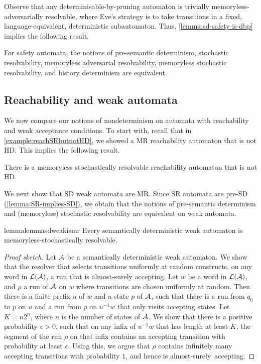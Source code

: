 Observe that any determinisable-by-pruning automaton is trivially memoryless-adversarially resolvable, where Eve's strategy is to take transitions in a fixed, language-equivalent, deterministic subautomaton. Thus, \cref{lemma:sd-safety-is-dbp} implies the following result.

\begin{lemma}\label{lemma:comp-safety}
    For safety automata, the notions of pre-semantic determinism, stochastic resolvability, memoryless adversarial resolvability, memoryless stochastic resolvability, and history determinism are equivalent.
\end{lemma}

\subsection{Reachability and weak automata}\label{subsec:sac-rw}
We now compare our notions of nondeterminism on automata with reachability and weak acceptance conditions. To start with, recall that in \cref{example:reachSRbutnotHD}, we showed a MR reachability automaton that is not HD. This implies the following result.
\begin{lemma}\label{lemma:reachability-MR-not-HD}
    There is a memoryless stochastically resolvable reachability automaton that is not HD.
\end{lemma}

We next show that SD weak automata are MR. Since SR automata are pre-SD (\cref{lemma:SR-implies-SD}), we obtain that the notions of pre-semantic determinism and (memoryless) stochastic resolvability are equivalent on weak automata.  

\begin{restatable}{lemma}{lemmasdweakismr}\label{lemma:sdweak-is-mr}
    Every semantically deterministic weak automaton is memoryless-stochastically resolvable. 
\end{restatable}
\begin{proof}[Proof sketch]
Let $\mathcal{A}$ be a semantically deterministic weak automaton. We show that the resolver that selects transitions uniformly at random constructs, on any word in $\mathcal{L}(\mathcal{A})$, a run that is almost-surely accepting. Let $w$ be a word in $\mathcal{L}(\mathcal{A})$, and $\rho$ a run of $\mathcal{A}$ on $w$ where transitions are chosen uniformly at random. Then there is a finite prefix $u$ of $w$ and a state $p$ of $\mathcal{A}$, such that there is a run from $q_0$ to $p$ on $u$ and a run from $p$ on $u^{-1}w$ that only visits accepting states. Let $K=n2^n$, where $n$ is the number of states of $\mathcal{A}$. We show that there is a positive probability $\epsilon>0$, such that on any infix of $u^{-1}w$ that has length at least $K$, the segment of the run $\rho$ on that infix contains an accepting transition with probability at least $\epsilon$. Using this, we argue that $\rho$ contains infinitely many accepting transitions with probability $1$, and hence is almost-surely~accepting.
\end{proof}

